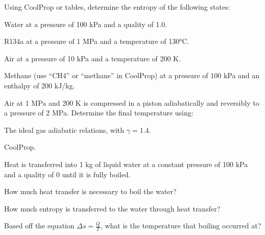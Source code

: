 \begin{homework}
  \question Using CoolProp or tables, determine the entropy of the following states:
  \begin{questionparts}
  \item Water at a pressure of 100 kPa and a quality of 1.0. \answer{[7.36 $\frac{\rm kJ}{\rm kg\,K}$]}
  \item R134a at a pressure of 1 MPa and a temperature of 130°C. \answer{[1.98 $\frac{\rm kJ}{\rm kg\,K}$]}
  \item Air at a pressure of 10 kPa and a temperature of 200 K. \answer{[4.15 $\frac{\rm kJ}{\rm kg\,K}$]}
  \item Methane (use ``CH4'' or ``methane'' in CoolProp) at a pressure of 100 kPa and an enthalpy of 200 kJ/kg. \answer{[1.79 $\frac{\rm kJ}{\rm kg\,K}$]}
  \end{questionparts}
  \question Air at 1 MPa and 200 K is compressed in a piston adiabatically and reversibly to a pressure of 2 MPa.  Determine the final temperature using:
  \begin{questionparts}
  \item The ideal gas adiabatic relations, with $\gamma=1.4$. \answer{[243.8 K]}
  \item CoolProp. \answer{[244.8 K]}
  \end{questionparts}

  \question Heat is transferred into 1 kg of liquid water at a constant pressure of 100 kPa and a quality of 0 until it is fully boiled.
  \begin{questionparts}
  \item How much heat transfer is necessary to boil the water? \answer{[2257.4 kJ]}
  \item How much entropy is transferred to the water through heat transfer? \answer{[6.056 kJ/K]}
  \item Based off the equation $\Delta s = \frac{Q}{T}$, what is the temperature that boiling occurred at? \answer{[372.75 K]}
  \end{questionparts}
  

\end{homework}
